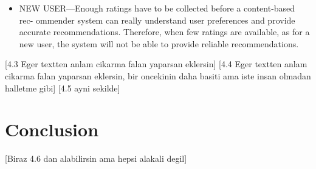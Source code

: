 \begin{itemize}
	\item NEW USER—Enough ratings have to be collected before a content-based rec- ommender system can really understand user preferences and provide accurate recommendations. Therefore, when few ratings are available, as for a new user, the system will not be able to provide reliable recommendations.
\end{itemize}

[4.3 Eger textten anlam cikarma falan yaparsan eklersin]
[4.4 Eger textten anlam cikarma falan yaparsan eklersin, bir oncekinin daha basiti ama iste insan olmadan halletme gibi]
[4.5 ayni sekilde]

\section{Conclusion}
[Biraz 4.6 dan alabilirsin ama hepsi alakali degil]

